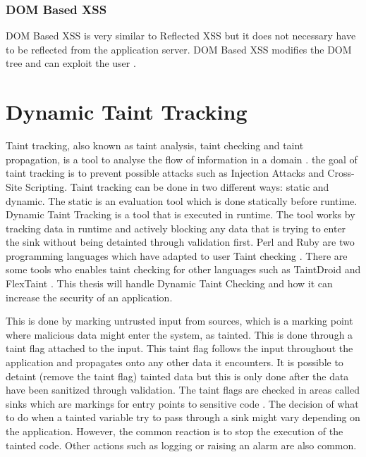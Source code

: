 \subsubsection{DOM Based XSS}
DOM Based XSS is very similar to Reflected XSS but it does not necessary have to be reflected from the application server. DOM Based XSS modifies the DOM tree and can exploit the user \parencite{Secure_Web}.


\section{Dynamic Taint Tracking}
\label{DynamicTaintTracking}
Taint tracking, also known as taint analysis, taint checking and taint propagation, is a tool to analyse the flow of information in a domain \parencite{Pan2015}. the goal of taint tracking is to prevent possible attacks such as Injection Attacks and Cross-Site Scripting. Taint tracking can be done in two different ways: static and dynamic. The static is an evaluation tool which is done statically before runtime. Dynamic Taint Tracking is a tool that is executed in runtime. The tool works by tracking data in runtime and actively blocking any data that is trying to enter the sink without being detainted through validation first. Perl and Ruby are two programming languages which have adapted to user Taint checking \parencite{perl, ruby}. There are some tools who enables taint checking for other languages such as TaintDroid \parencite{Ma2010} and FlexTaint \parencite{Venkataramani2008}. This thesis will handle Dynamic Taint Checking and how it can increase the security of an application.

This is done by marking untrusted input from sources, which is a marking point where malicious data might enter the system, as tainted. This is done through a taint flag attached to the input. This taint flag follows the input throughout the application and propagates onto any other data it encounters. It is possible to detaint (remove the taint flag) tainted data but this is only done after the data have been sanitized through validation. The taint flags are checked in areas called sinks which are markings for entry points to sensitive code \parencite{Pan2015, Venkataramani2008}. The decision of what to do when a tainted variable try to pass through a sink might vary depending on the application. However, the common reaction is to stop the execution of the tainted code. Other actions such as logging or raising an alarm are also common. 
	
